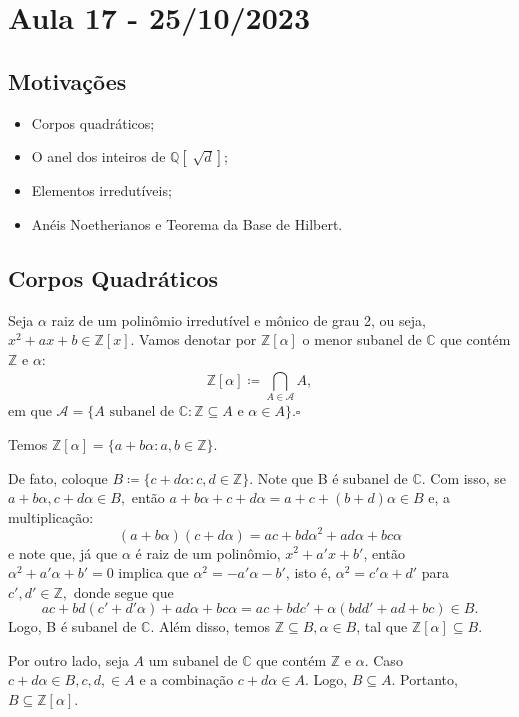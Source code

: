 \documentclass[AlgebraII/algebraII_notes.tex]{subfiles}
\begin{document}
\section{Aula 17 - 25/10/2023}
\subsection{Motivações}
\begin{itemize}
	\item Corpos quadráticos;
	\item O anel dos inteiros de \(\mathbb{Q}[\sqrt[]{d}]\);
	\item Elementos irredutíveis;
	\item Anéis Noetherianos e Teorema da Base de Hilbert.
\end{itemize}
\subsection{Corpos Quadráticos}
\begin{def*}
	Seja \(\alpha \) raiz de um polinômio irredutível e mônico de grau 2, ou seja, \(x^{2}+ax+b\in \mathbb{Z}[x].\) Vamos denotar
	por \(\mathbb{Z}[\alpha ]\) o menor subanel de \(\mathbb{C}\) que contém \(\mathbb{Z}\) e \(\alpha \):
	\[
		\mathbb{Z}[\alpha ]\coloneqq \bigcap_{A\in \mathcal{A}}^{}{A},
	\]
	em que \(\mathcal{A} = \{A\text{ subanel de }\mathbb{C}: \mathbb{Z}\subseteq{A}\text{ e }\alpha \in A\}. \square\)
\end{def*}
\begin{prop*}
	Temos \(\mathbb{Z}[\alpha ] = \{a + b\alpha : a, b\in \mathbb{Z}\}.\)
\end{prop*}
\begin{proof*}
	De fato, coloque \(B\coloneqq \{c+d\alpha : c, d\in \mathbb{Z}\}.\) Note que B é subanel de \(\mathbb{C}\).
	Com isso, se \(a + b\alpha , c + d\alpha \in B,\) então \(a + b\alpha + c +d\alpha = a + c + (b+d)\alpha \in B\)
	e, a multiplicação:
	\[
		(a+b\alpha )(c+d\alpha ) = ac + bd\alpha^{2} + ad\alpha + bc\alpha
	\]
	e note que, já que \(\alpha \) é raiz de um polinômio, \(x^{2} + a'x + b'\), então \(\alpha ^{2} + a'\alpha  + b' = 0\) implica
	que \(\alpha^{2} = -a'\alpha  - b'\), isto é, \(\alpha^{2} = c'\alpha + d'\) para \(c', d'\in \mathbb{Z},\) donde segue que
	\[
		ac + bd(c'+d'\alpha ) + ad\alpha + bc\alpha = ac + bdc' + \alpha(bdd'+ad+bc)\in B.
	\]
	Logo, B é subanel de \(\mathbb{C}.\) Além disso, temos \(\mathbb{Z}\subseteq{B}, \alpha \in B\), tal que
	\(\mathbb{Z}[\alpha ]\subseteq{B}.\)

	Por outro lado, seja \(A\) um subanel de \(\mathbb{C}\) que contém \(\mathbb{Z}\) e \(\alpha .\) Caso \(c+d\alpha \in B, c, d,\in A\)
	e a combinação \(c+d\alpha \in A\). Logo, \(B \subseteq{A}.\) Portanto, \(B\subseteq{\mathbb{Z}[\alpha ]}\). \qedsymbol
\end{proof*}
\end{document}
